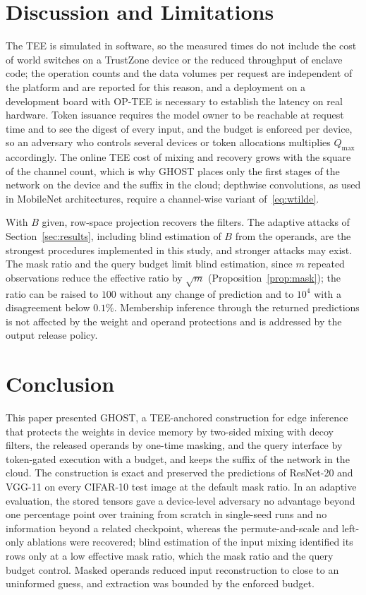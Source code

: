 \documentclass[lettersize,journal]{IEEEtran}
\begin{document}
\section{Discussion and Limitations}
\label{sec:discussion}
The TEE is simulated in software, so the measured times do not include the cost of world switches on a TrustZone device or the reduced throughput of enclave code; the operation counts and the data volumes per request are independent of the platform and are reported for this reason, and a deployment on a development board with OP-TEE is necessary to establish the latency on real hardware. Token issuance requires the model owner to be reachable at request time and to see the digest of every input, and the budget is enforced per device, so an adversary who controls several devices or token allocations multiplies $Q_{\max}$ accordingly. The online TEE cost of mixing and recovery grows with the square of the channel count, which is why GHOST places only the first stages of the network on the device and the suffix in the cloud; depthwise convolutions, as used in MobileNet architectures, require a channel-wise variant of~\eqref{eq:wtilde}.

With $B$ given, row-space projection recovers the filters. The adaptive attacks of Section~\ref{sec:results}, including blind estimation of $B$ from the operands, are the strongest procedures implemented in this study, and stronger attacks may exist. The mask ratio and the query budget limit blind estimation, since $m$ repeated observations reduce the effective ratio by $\sqrt m$ (Proposition~\ref{prop:mask}); the ratio can be raised to $100$ without any change of prediction and to $10^4$ with a disagreement below $0.1\%$. Membership inference through the returned predictions is not affected by the weight and operand protections and is addressed by the output release policy.

\section{Conclusion}
\label{sec:conclusion}
This paper presented GHOST, a TEE-anchored construction for edge inference that protects the weights in device memory by two-sided mixing with decoy filters, the released operands by one-time masking, and the query interface by token-gated execution with a budget, and keeps the suffix of the network in the cloud. The construction is exact and preserved the predictions of ResNet-20 and VGG-11 on every CIFAR-10 test image at the default mask ratio. In an adaptive evaluation, the stored tensors gave a device-level adversary no advantage beyond one percentage point over training from scratch in single-seed runs and no information beyond a related checkpoint, whereas the permute-and-scale and left-only ablations were recovered; blind estimation of the input mixing identified its rows only at a low effective mask ratio, which the mask ratio and the query budget control. Masked operands reduced input reconstruction to close to an uninformed guess, and extraction was bounded by the enforced budget.
\end{document}
